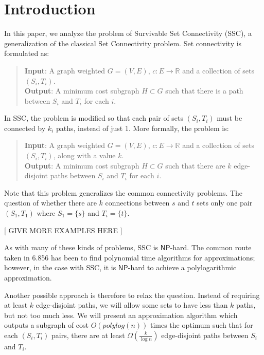 \documentclass[12pt]{article}
\begin{document}
\maketitle

\section{Introduction}

In this paper, we analyze the problem of Survivable Set Connectivity (SSC), a generalization of the classical Set Connectivity problem. Set connectivity is formulated as:
\begin{quote}
\textbf{Input}: A graph weighted $G = (V, E)$, $c: E \rightarrow \mathbb{R}$ and a collection of sets $(S_i, T_i)$. \\
\textbf{Output}: A minimum cost subgraph $H \subset G$ such that there is a path between $S_i$ and $T_i$ for each $i$. 
\end{quote}
In SSC, the problem is modified so that each pair of sets $(S_i,T_i)$ must be connected by $k_i$ paths, instead of just 1. More formally, the problem is:

\begin{quote}
\textbf{Input}: A graph weighted $G = (V, E)$, $c: E \rightarrow \mathbb{R}$ and a collection of sets $(S_i, T_i)$, along with a value $k$. \\
\textbf{Output}: A minimum cost subgraph $H \subset G$ such that there are $k$ edge-disjoint paths between $S_i$ and $T_i$ for each $i$. 
\end{quote}

Note that this problem generalizes the common connectivity problems. The question of whether there are $k$ connections between $s$ and $t$ sets only one pair $(S_1, T_1)$ where $S_1 = \{ s \}$ and $T_i = \{ t \}$. 

[ GIVE MORE EXAMPLES HERE ]

As with many of these kinds of problems, SSC is $\mathsf{NP}$-hard. The common route taken in 6.856 has been to find polynomial time algorithms for approximations; however, in the case with SSC, it is $\mathsf{NP}$-hard to achieve a polylogarithmic approximation. 

Another possible approach is therefore to relax the question. Instead of requiring at least $k$ edge-disjoint paths, we will allow some sets to have less than $k$ paths, but not too much less. We will present an approximation algorithm which outputs a subgraph of cost $O(polylog(n))$ times the optimum such that for each $(S_i, T_i)$ pairs, there are at least $\Omega(\frac{k}{\log n})$ edge-disjoint paths between $S_i$ and $T_i$. 
\end{document}
